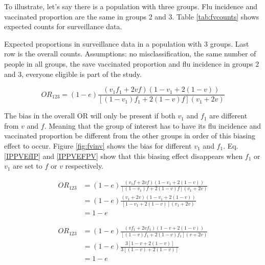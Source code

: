 \documentclass[11pt]{article}
\begin{document}
To illustrate, let's say there is a population with three groups. Flu incidence and vaccinated proportion are the same in groups 2 and 3. Table \ref{tab:fvcounts} shows expected counts for surveillance data. 

\begin{table}[h]
\centering
\caption{
Expected proportions in surveillance data in a population with 3 groups. Last row is the overall counts. 
Assumptions: no misclassification, the same number of people in all groups, the save vaccinated proportion and flu incidence in groups 2 and 3, everyone eligible is part of the study. \label{tab:fvcounts}
}
	
\end{table}

\begin{equation} \label{ORIPfPv}
OR_{123}=(1-e)\frac{(v_1f_1+2vf)(1-v_1+2(1-v))}{[(1-v_1)f_1+2(1-v)f](v_1+2v)}
\end{equation}

The bias in the overall OR will only be present if both $v_1$ and $f_1$ are different from $v$ and $f$. Meaning that the group of interest has to have its flu incidence and vaccinated proportion be different from the other groups in order of this biasing effect to occur. Figure \ref{fig:fvinv} shows the bias for different $v_1$ and $f_1$. Eq. \ref{IPPVEfIP} and \ref{IPPVEFPV} show that this biasing effect disappears when $f_1$ or $v_1$ are set to $f$ or $v$ respectively.

\begin{equation} \label{IPPVEfIP}
\begin{aligned}
OR_{123}&=(1-e)\frac{(v_1f+2vf)(1-v_1+2(1-v))}{[(1-v_1)f+2(1-v)f](v_1+2v)} \\
&=(1-e)\frac{(v_1+2v)(1-v_1+2(1-v))}{[1-v_1+2(1-v)](v_1+2v)} \\
&=1-e
\end{aligned}
\end{equation}

\begin{equation} \label{IPPVEFPV}
\begin{aligned}
OR_{123}&=(1-e)\frac{(vf_1+2vf_1)(1-v+2(1-v))}{[(1-v)f_1+2(1-v)f_1](v+2v)} \\
&=(1-e)\frac{3[1-v+2(1-v)]}{3[(1-v)+2(1-v)]} \\
&=1-e
\end{aligned}
\end{equation} 
\end{document}
